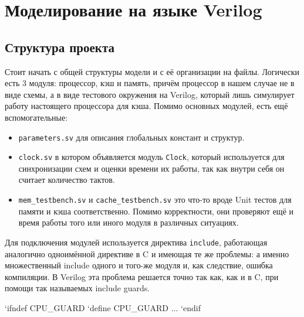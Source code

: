 \documentclass[14pt, russian, onesize]{extreport}
\begin{document}
\section*{ Моделирование на языке Verilog }
\subsection*{ Структура проекта }
Стоит начать с общей структуры модели и с её организации на
файлы. Логически есть 3 модуля: процессор, кэш и память,
причём процессор в нашем случае не в виде схемы,
а в виде тестового окружения на Verilog, который лишь 
симулирует работу настоящего процессора для кэша.
Помимо основных модулей, есть ещё вспомогательные: 
\begin{itemize}
    \item 
        \texttt{parameters.sv} для описания глобальных констант
        и структур.
    \item
        \texttt{clock.sv} в котором объявляется
        модуль \texttt{Clock}, который используется
        для синхронизации схем и оценки времени их работы, так как
        внутри себя он считает количество тактов.
    \item 
        \texttt{mem\_testbench.sv} и \texttt{cache\_testbench.sv}
        это что-то вроде Unit тестов для памяти и кэша соответственно.
        Помимо корректности, они проверяют ещё и время работы 
        того или иного модуля в различных ситуациях.
\end{itemize}
Для подключения модулей используется директива \texttt{include}, работающая
аналогично одноимённой директиве в C и имеющая те же проблемы: а именно
множественный include одного и того-же модуля и, как следствие,
ошибка компиляции. В Verilog эта проблема решается точно
так как, как и в C, при помощи так называемых include guards.
\begin{svcode}
`ifndef CPU_GUARD
`define CPU_GUARD
...
`endif
\end{svcode}
\end{document}
